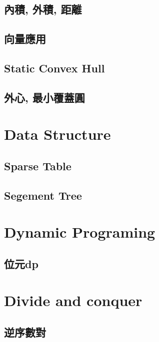 \subsection{內積, 外積, 距離} 

\subsection{向量應用} 

\subsection{Static Convex Hull} 

\subsection{外心, 最小覆蓋圓} 


\section{Data Structure}
\subsection{Sparse Table}

\subsection{Segement Tree}


\section{Dynamic Programing}
\subsection{位元dp}


\section{Divide and conquer}
\subsection{逆序數對}

